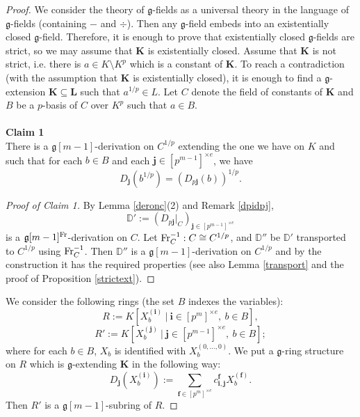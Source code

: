 \documentclass[10pt]{amsart}
\theoremstyle{definition}
\begin{document}
\begin{proof}
We consider the theory of $\mathfrak{g}$-fields as a universal theory in the language of $\mathfrak{g}$-fields (containing $-$ and $\div$). Then any  $\mathfrak{g}$-field embeds into an existentially closed $\mathfrak{g}$-field. Therefore, it is enough to prove that existentially closed $\mathfrak{g}$-fields are strict, so we may assume that $\mathbf{K}$ is existentially closed. Assume that $\mathbf{K}$ is not strict, i.e. there is $a\in K\setminus K^p$ which is a constant of $\mathbf{K}$. To reach a contradiction (with the assumption that $\mathbf{K}$ is existentially closed), it is enough to find a $\mathfrak{g}$-extension $\mathbf{K}\subseteq \mathbf{L}$ such that $a^{1/p}\in L$. Let $C$ denote the field of constants of $\mathbf{K}$ and $B$ be a $p$-basis of $C$ over $K^p$ such that $a\in B$.
\\
\\
{\bf Claim 1}
\\
There is a $\mathfrak{g}[m-1]$-derivation on $C^{1/p}$ extending the one we have on $K$ and such that for each $b\in B$ and each $\mathbf{j}\in [p^{m-1}]^{\times e}$, we have
$$D_{\mathbf{j}}(b^{1/p})=(D_{p\mathbf{j}}(b))^{1/p}.$$
\begin{proof}[Proof of Claim 1]
By Lemma \ref{deronc}(2) and Remark \ref{dpidpj},
$$\mathbb{D}':=\left(D_{p\mathbf{j}}|_C\right)_{\mathbf{j}\in [p^{m-1}]^{\times e}}$$
is a $\mathfrak{g}[m-1]^{\operatorname{Fr}}$-derivation on $C$. Let $\operatorname{Fr}_C^{-1}:C\cong C^{1/p}$, and $\mathbb{D}''$ be $\mathbb{D}'$ transported to $C^{1/p}$ using $\operatorname{Fr}_C^{-1}$. Then $\mathbb{D}''$ is a $\mathfrak{g}[m-1]$-derivation on $C^{1/p}$ and by the construction it has the required properties (see also Lemma \ref{transport} and the proof of Proposition \ref{strictext}).
\end{proof}
We consider the following rings (the set $B$ indexes the variables):
$$R:=K\left[X_b^{(\mathbf{i})}\ |\ \mathbf{i}\in [p^m]^{\times e},\ b\in B\right],$$
$$R':=K\left[X_b^{(\mathbf{j})}\ |\ \mathbf{j}\in [p^{m-1}]^{\times e},\ b\in B\right];$$
where for each $b\in B$, $X_b$ is identified with $X_b^{(0,\ldots,0)}$. We put a $\mathfrak{g}$-ring structure on $R$ which is $\mathfrak{g}$-extending $\mathbf{K}$ in the following way:
$$D_{\mathbf{j}}\left(X_b^{(\mathbf{i})}\right):=\sum_{\mathbf{f}\in [p^m]^{\times e}}c^{\mathbf{f}}_{\mathbf{i},\mathbf{j}}X_b^{(\mathbf{f})}.$$
Then $R'$ is a $\mathfrak{g}[m-1]$-subring of $R$.

\end{proof}
\end{document}
